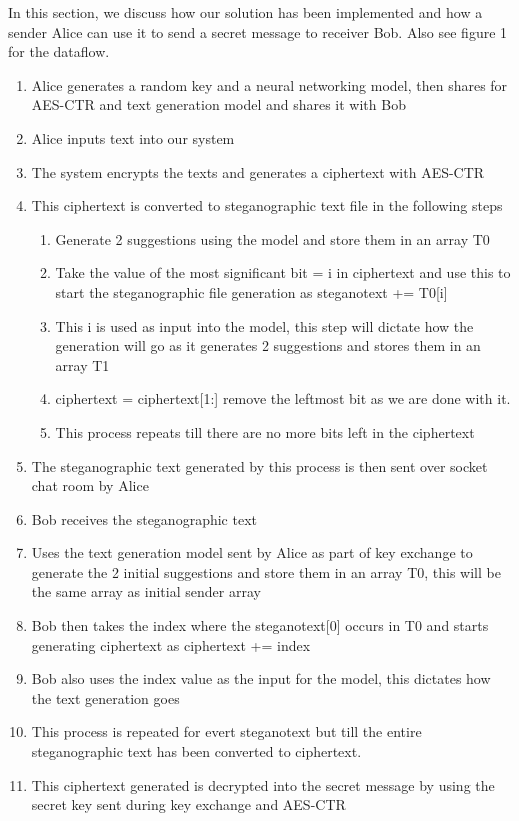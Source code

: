 \documentclass[12pt]{article}
\begin{document}
In this section, we discuss how our solution has been implemented and how a sender Alice can use it to send a secret message to receiver Bob. Also see figure 1 for the dataflow.\\
\begin{enumerate}
    \item Alice generates a random key and a neural networking model, then shares  for AES-CTR and text generation model and shares it with Bob
    \item Alice inputs text into our system
    \item The system encrypts the texts and generates a ciphertext with AES-CTR
    \item This ciphertext is converted to steganographic text file in the following steps
    \begin{enumerate}
        \item Generate 2 suggestions using the model and store them in an array T0
        \item Take the value of the most significant bit = i in ciphertext and use this to start the steganographic file generation as steganotext += T0[i]
        \item This i is used as input into the model, this step will dictate how the generation will go as it generates 2 suggestions and stores them in an array T1
        \item ciphertext = ciphertext[1:] remove the leftmost bit as we are done with it.
        \item This process repeats till there are no more bits left in the ciphertext
    \end{enumerate}
    \item The steganographic text generated by this process is then sent over socket chat room by Alice
    \item Bob receives the steganographic text
    \item Uses the text generation model sent by Alice as part of key exchange to generate the 2 initial suggestions and store them in an array T0, this will be the same array as initial sender array
    \item Bob then takes the index where the steganotext[0] occurs in T0 and starts generating ciphertext as  ciphertext += index
    \item Bob also uses the index value as the input for the model, this dictates how the text generation goes
    \item This process is repeated for evert steganotext but till the entire steganographic text has been converted to ciphertext.
    \item This ciphertext generated is decrypted into the secret message by using the secret key sent during key exchange and AES-CTR
\end{enumerate}
\end{document}
